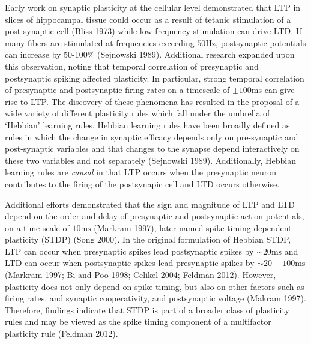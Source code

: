 \documentclass{ucetd}
\begin{document}
Early work on synaptic plasticity at the cellular level demonstrated that LTP in slices of hippocampal tissue could occur as a result of tetanic stimulation of a post-synaptic cell (Bliss 1973) while low frequency stimulation can drive LTD. If many fibers are stimulated at frequencies exceeding $50\text{Hz}$, postsynaptic potentials can increase by 50-100\% (Sejnowski 1989). Additional research expanded upon this observation, noting that temporal correlation of presynaptic and postsynaptic spiking affected plasticity. In particular, strong temporal correlation of presynaptic and postsynaptic firing rates on a timescale of $\pm 100 \text{ms}$ can give rise to LTP. The discovery of these phenomena has resulted in the proposal of a wide variety of different plasticity rules which fall under the umbrella of `Hebbian' learning rules. Hebbian learning rules have been broadly defined as rules in which the change in synaptic efficacy depends only on pre-synaptic and post-synaptic variables and that changes to the synapse depend interactively on these two variables and not separately (Sejnowski 1989).  Additionally, Hebbian learning rules are \emph{causal} in that LTP occurs when the presynaptic neuron contributes to the firing of the postsynapic cell and LTD occurs otherwise.

Additional efforts demonstrated that the sign and magnitude of LTP and LTD depend on the order and delay of presynaptic and postsynaptic action potentials, on a time scale of $10\text{ms}$ (Markram 1997), later named spike timing dependent plasticity (STDP) (Song 2000). In the original formulation of Hebbian STDP, LTP can occur when presynaptic spikes lead postsynaptic spikes by $\sim 20\mathrm{ms}$ and LTD can occur when postsynaptic spikes lead presynaptic spikes by $\sim 20-100\mathrm{ms}$ (Markram 1997; Bi and Poo 1998; Celikel 2004; Feldman 2012). However, plasticity does not only depend on spike timing, but also on other factors such as firing rates, and synaptic cooperativity, and postsynaptic voltage (Makram 1997). Therefore, findings indicate that STDP is part of a broader class of plasticity rules and may be viewed as the spike timing component of a multifactor plasticity rule (Feldman 2012).
\end{document}
